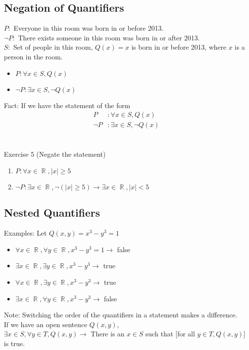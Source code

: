 \documentclass[11pt, a4paper]{memoir}
\DeclareMathOperator{\R}{{\mathbb{R}}}
\theoremstyle{change}
\theoremstyle{plain}
\theoremstyle{nonumberplain}
\numberwithin{equation}{section}
\begin{document}
\subsection{Negation of Quantifiers}
$P: $ Everyone in this room was born in or before 2013. \\
$\neg P: $ There exists someone in this room was born in or after 2013.\\
$S: $ Set of people in this room, $Q(x) = x$ is born in or before 2013, where $x$ is a person in the room.
\begin{itemize}
    \item $P: \forall x \in S, Q(x)$
    \item $\neg P: \exists x \in S, \neg Q(x)$
\end{itemize}
Fact: If we have the statement of the form 
\begin{align*}
    P&: \forall x \in S, Q(x)\\
    \neg P&: \exists x \in S, \neg Q(x)
\end{align*}
\\ \vspace{1ex} \\
Exercise 5 (Negate the statement)
\begin{enumerate}
    \item $P: \forall x \in \R, |x| \ge 5$
    \item $\neg P: \exists x \in \R, \neg(|x| \ge 5) \to \exists x \in \R, |x| < 5$
\end{enumerate}
\subsection{Nested Quantifiers}
Examples:
Let $Q(x, y) = x^3 - y^3 = 1$
\begin{itemize}
    \item $\forall x \in \R, \forall y \in \R, x^3 - y^3 = 1 \to $ false
    \item $\exists x \in \R, \exists y \in \R, x^3 - y^3 \to $ true
    \item $\forall x \in \R, \exists y \in \R, x^3 - y^3 \to $ true
    \item $\exists x \in \R, \forall y \in \R, x^3 - y^3 \to $ false
\end{itemize}
Note: Switching the order of the quantifiers in a statement makes a difference.\\
If we have an open sentence $Q(x, y)$,\\
$\exists x \in S, \forall y \in T, Q(x, y) \to $ There is an $x \in S$ such that [for all $y \in T, Q(x,y)$] is true.
\end{document}
